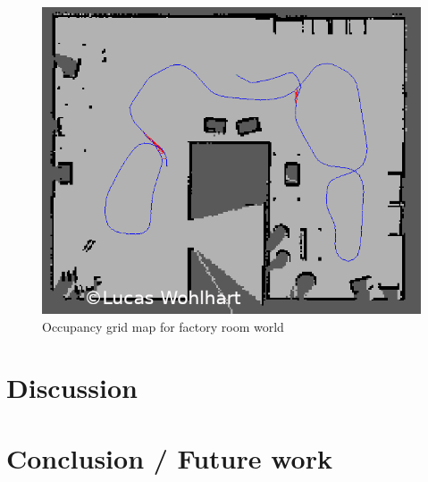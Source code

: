 \documentclass[10pt,journal,compsoc]{IEEEtran}
\begin{document}
\begin{figure}[thpb]
      \centering
      \includegraphics[width=\linewidth]{img/factory_occupancy_grid}
      \caption{Occupancy grid map for factory room world}
      \label{fig:factory_occupancy_grid}
\end{figure}


\section{Discussion}


\section{Conclusion / Future work}



\end{document}
